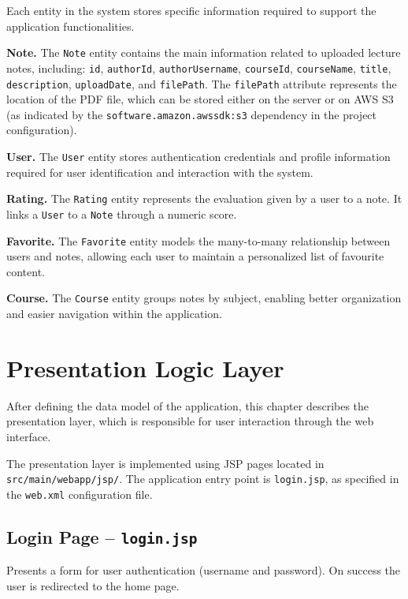 \documentclass[12pt, a4paper]{article}
\begin{document}
    Each entity in the system stores specific information required to support
    the application functionalities.

    \textbf{Note.}
    The \texttt{Note} entity contains the main information related to uploaded
    lecture notes, including:
    \texttt{id}, \texttt{authorId}, \texttt{authorUsername}, \texttt{courseId},
    \texttt{courseName}, \texttt{title}, \texttt{description}, \texttt{uploadDate},
    and \texttt{filePath}.
    The \texttt{filePath} attribute represents the location of the PDF file,
    which can be stored either on the server or on AWS S3 (as indicated by the
    \texttt{software.amazon.awssdk:s3} dependency in the project configuration).

    \textbf{User.}
    The \texttt{User} entity stores authentication credentials and profile
    information required for user identification and interaction with the system.

    \textbf{Rating.}
    The \texttt{Rating} entity represents the evaluation given by a user to a note.
    It links a \texttt{User} to a \texttt{Note} through a numeric score.

    \textbf{Favorite.}
    The \texttt{Favorite} entity models the many-to-many relationship between
    users and notes, allowing each user to maintain a personalized list of
    favourite content.

    \textbf{Course.}
    The \texttt{Course} entity groups notes by subject, enabling better
    organization and easier navigation within the application.


    \newpage
    \section{Presentation Logic Layer}

    After defining the data model of the application, this chapter describes the
    presentation layer, which is responsible for user interaction through the web interface.

    The presentation layer is implemented using JSP pages located in
    \texttt{src/main/webapp/jsp/}. The application entry point is \texttt{login.jsp},
    as specified in the \texttt{web.xml} configuration file.

    \subsection{Login Page -- \texttt{login.jsp}}
    Presents a form for user authentication (username and password).
    On success the user is redirected to the home page.
\end{document}
